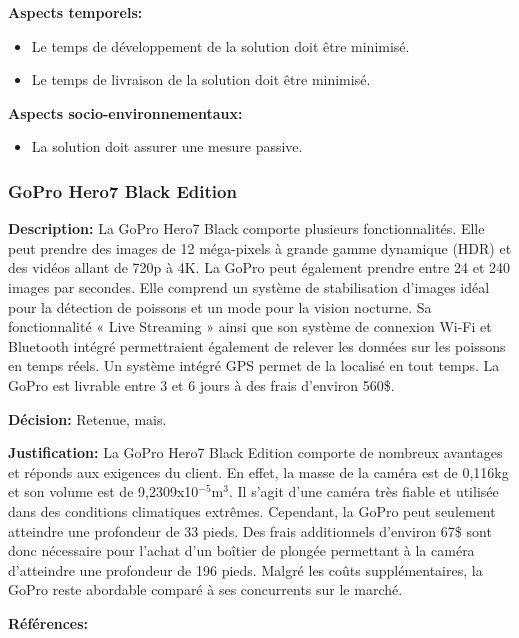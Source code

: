 \textbf{Aspects temporels:}
\begin{itemize}[label = {--}]
    \item Le temps de développement de la solution doit être minimisé.
    \item Le temps de livraison de la solution doit être minimisé.
\end{itemize}

\textbf{Aspects socio-environnementaux:}
\begin{itemize}[label = {--}]
    \item La solution doit assurer une mesure passive.
\end{itemize}

\subsubsection{GoPro Hero7 Black Edition}

\textbf{Description:} La GoPro Hero7 Black comporte plusieurs fonctionnalités. Elle peut prendre des images de 12 méga-pixels à grande gamme dynamique (HDR) et des vidéos allant de 720p à 4K. La GoPro peut également prendre entre 24 et 240 images par secondes. Elle comprend un système de stabilisation d'images idéal pour la détection de poissons et un mode pour la vision nocturne. Sa fonctionnalité « Live Streaming » ainsi que son système de connexion Wi-Fi et Bluetooth intégré permettraient également de relever les données sur les poissons en temps réels. Un système intégré GPS permet de la localisé en tout temps. La GoPro est livrable entre 3 et 6 jours à des frais d'environ 560\$. \vspace{5mm}

\textbf{Décision:} Retenue, mais. \vspace{5mm}

\textbf{Justification:} La GoPro Hero7 Black Edition comporte de nombreux avantages et réponds aux exigences du client. En effet, la masse de la caméra est de 0,116kg et son volume est de 9,2309x10$^{-5}$m$^3$. Il s'agit d'une caméra très fiable et utilisée dans des conditions climatiques extrêmes. Cependant, la GoPro peut seulement atteindre une profondeur de 33 pieds. Des frais additionnels d'environ 67\$ sont donc nécessaire pour l'achat d'un boîtier de plongée permettant à la caméra d'atteindre une profondeur de 196 pieds. Malgré les coûts supplémentaires, la GoPro reste abordable comparé à ses concurrents sur le marché. \vspace{5mm}

\textbf{Références:} \cite{GoPro_Specs} \cite{GoPro_Waterproof}


